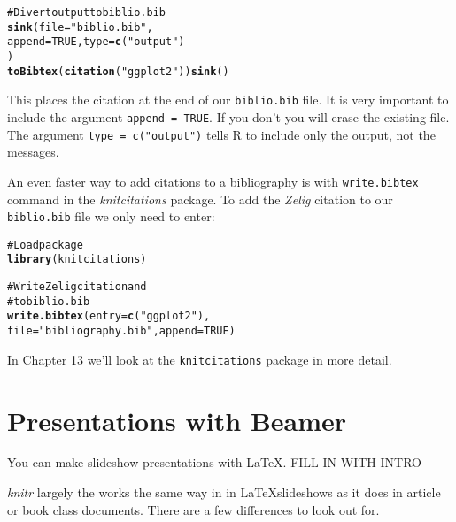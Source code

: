 \documentclass[ChapterTOCs,krantz1]{krantz}\usepackage{graphicx, color}
\makeatletter
\newcommand{\hlfunctioncall}[1]{\textcolor[rgb]{0.501960784313725,0,0.329411764705882}{\textbf{#1}}}%
\newcommand{\hlstring}[1]{\textcolor[rgb]{0.6,0.6,1}{#1}}%
\newcommand{\hlcomment}[1]{\textcolor[rgb]{0.180392156862745,0.6,0.341176470588235}{#1}}%
\newenvironment{kframe}{%
 \def\at@end@of@kframe{}%
 \ifinner\ifhmode%
  \def\at@end@of@kframe{\end{minipage}}%
  \begin{minipage}{\columnwidth}%
 \fi\fi%
 \def\FrameCommand##1{\hskip\@totalleftmargin \hskip-\fboxsep
 \colorbox{shadecolor}{##1}\hskip-\fboxsep
     \hskip-\linewidth \hskip-\@totalleftmargin \hskip\columnwidth}%
 \MakeFramed {\advance\hsize-\width
   \@totalleftmargin\z@ \linewidth\hsize
   \@setminipage}}%
 {\par\unskip\endMakeFramed%
 \at@end@of@kframe}
\newenvironment{knitrout}{}{} %
\makeatother
\begin{document}
\begin{knitrout}
\color{fgcolor}\begin{kframe}
\begin{alltt}
\hlcomment{# Divert output to biblio.bib}
\hlfunctioncall{sink}(file = \hlstring{"biblio.bib"}, 
     append = TRUE, type = \hlfunctioncall{c}(\hlstring{"output"})
     )      
\hlfunctioncall{toBibtex}(\hlfunctioncall{citation}(\hlstring{"ggplot2"})) \hlfunctioncall{sink}()
\end{alltt}
\end{kframe}
\end{knitrout}


\noindent This places the citation at the end of our \texttt{biblio.bib} file. It is very important to include the argument \texttt{append = TRUE}. If you don't you will erase the existing file. The argument \texttt{type = c("output")} tells R to include only the output, not the messages.

An even faster way to add citations to a bibliography is with \texttt{write.bibtex} command in the \emph{knitcitations} package. To add the \emph{Zelig} citation to our \texttt{biblio.bib} file we only need to enter:

\begin{knitrout}
\color{fgcolor}\begin{kframe}
\begin{alltt}
\hlcomment{# Load package}
\hlfunctioncall{library}(knitcitations)
 
\hlcomment{# Write Zelig citation and}
\hlcomment{# to biblio.bib}
\hlfunctioncall{write.bibtex}(entry = \hlfunctioncall{c}(\hlstring{"ggplot2"}), 
              file = \hlstring{"bibliography.bib"}, append = TRUE)
\end{alltt}
\end{kframe}
\end{knitrout}


\noindent In Chapter 13 we'll look at the \texttt{knitcitations} package in more detail.

\section{Presentations with Beamer}

You can make slideshow presentations with \LaTeX. FILL IN WITH INTRO

{\emph{knitr}} largely the works the same way in in \LaTeX slideshows as it does in article or book class documents. There are a few differences to look out for. 
\end{document}
